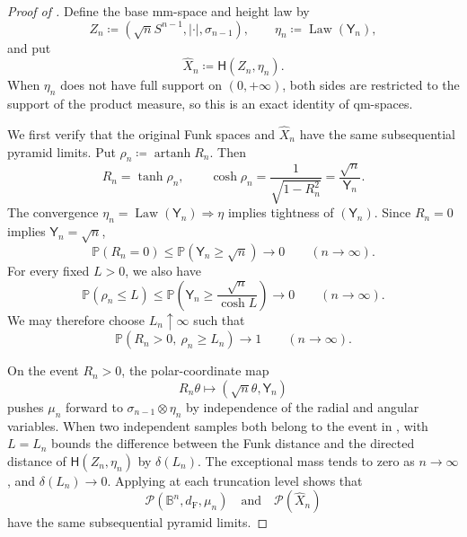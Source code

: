 \documentclass[10pt,a4paper]{amsart}
\numberwithin{equation}{section}
\newcommand{\B}{\mathbb B}
\newcommand{\Pyr}{\mathcal P}
\DeclareMathOperator{\artanh}{artanh}
\newcommand{\dF}{d_{\mathrm F}}
\begin{document}
\begin{proof}[Proof of ]
Define the base mm-space and height law by
\[
 Z_n\coloneqq(\sqrt nS^{n-1},|\cdot|,\sigma_{n-1}),
 \qquad
 \eta_n\coloneqq\operatorname{Law}(\mathsf Y_n),
\]
and put
\begin{equation}\label{eq:comparison-space}
 \widehat X_n\coloneqq\mathsf H(Z_n,\eta_n).
\end{equation}
When $\eta_n$ does not have full support on $(0,+\infty)$, both sides are restricted to the support of the product measure,
so this is an exact identity of qm-spaces.

We first verify that the original Funk spaces and $\widehat X_n$ have the same subsequential pyramid limits.  Put
$\rho_n\coloneqq\artanh R_n$.  Then
\[
 R_n=\tanh\rho_n,
 \qquad
 \cosh\rho_n=\frac1{\sqrt{1-R_n^2}}=\frac{\sqrt n}{\mathsf Y_n}.
\]
The convergence $\eta_n=\operatorname{Law}(\mathsf Y_n)\Rightarrow\eta$ implies tightness of $(\mathsf Y_n)$.  Since
$R_n=0$ implies $\mathsf Y_n=\sqrt n$,
\[
 \mathbb P(R_n=0)
 \le\mathbb P(\mathsf Y_n\ge\sqrt n)
 \longrightarrow0
 \qquad(n\to\infty).
\]
For every fixed $L>0$, we also have
\[
 \mathbb P(\rho_n\le L)
 \le\mathbb P\left(\mathsf Y_n\ge\frac{\sqrt n}{\cosh L}\right)
 \longrightarrow0
 \qquad(n\to\infty).
\]
We may therefore choose $L_n\uparrow\infty$ such that
\begin{equation}\label{eq:joint-radial-good-set}
 \mathbb P(R_n>0,\ \rho_n\ge L_n)
 \longrightarrow1
 \qquad(n\to\infty).
\end{equation}

On the event $R_n>0$, the polar-coordinate map
\[
 R_n\theta\longmapsto(\sqrt n\theta,\mathsf Y_n)
\]
pushes $\mu_n$ forward to $\sigma_{n-1}\otimes\eta_n$ by independence of the radial and angular variables.  When two
independent samples both belong to the event in ,
 with $L=L_n$ bounds the difference between the Funk distance and the
directed distance of $\mathsf H(Z_n,\eta_n)$ by $\delta(L_n)$.  The exceptional mass tends to zero as
$n\to\infty$, and $\delta(L_n)\to0$.  Applying  at each truncation level shows that
\begin{equation}\label{eq:joint-radial-same-subsequential-limits}
 \Pyr(\B^n,\dF,\mu_n)
 \quad\text{and}\quad
 \Pyr(\widehat X_n)
\end{equation}
have the same subsequential pyramid limits.


\end{proof}
\end{document}
